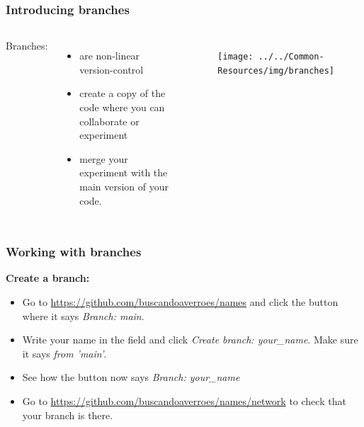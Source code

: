 \documentclass[aspectratio=169]{beamer} %
\newcommand{\trainingURL}[1]{{\color{blue}\url{#1}}}
\newcommand{\traininerUsername}{buscandoaverroes}
\newcommand{\repoName}{\traininerUsername/names}
\newcommand{\trainingRepoURL}[1]{\trainingURL{https://github.com/\repoName #1}}
\begin{document}
\begin{frame}
\frametitle{Introducing branches}

	\begin{columns}[c]

		Branches:
		\begin{itemize}
			\item are non-linear version-control
			\item create a copy of the code where you can collaborate or experiment
			\item merge your experiment with the main version of your code.
		\end{itemize}

		\begin{figure}
			\centering
			\texttt{[image: ../../Common-Resources/img/branches]}
			\label{fig:branches}
		\end{figure}

	\end{columns}

\end{frame}

\begin{frame}
\frametitle{Working with branches}


	\textbf{Create a branch:}
	\begin{itemize}
		\item Go to \trainingRepoURL{} and click the button where it says \textit{Branch: main}.
		\item Write your name in the field and click \textit{Create branch: your\_name}. Make sure it says \textit{from 'main'}.
		\item See how the button now says \textit{Branch: your\_name}
		\item Go to \trainingRepoURL{/network} to check that your branch is there.
	\end{itemize}

\end{frame}
\end{document}
